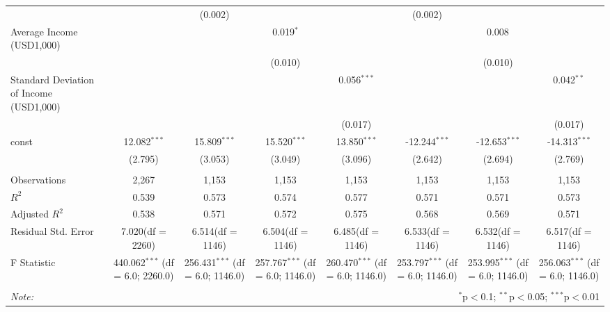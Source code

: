 \begin{table}[!htbp]
\begin{tabular}{@{\extracolsep{5pt}}lccccccc}
  & & (0.002) & & & (0.002) & & \\
 Average Income (USD1,000) & & & 0.019$^{*}$ & & & 0.008$^{}$ & \\
  & & & (0.010) & & & (0.010) & \\
 Standard Deviation of Income (USD1,000) & & & & 0.056$^{***}$ & & & 0.042$^{**}$ \\
  & & & & (0.017) & & & (0.017) \\
 const & 12.082$^{***}$ & 15.809$^{***}$ & 15.520$^{***}$ & 13.850$^{***}$ & -12.244$^{***}$ & -12.653$^{***}$ & -14.313$^{***}$ \\
  & (2.795) & (3.053) & (3.049) & (3.096) & (2.642) & (2.694) & (2.769) \\
\hline \\[-1.8ex]
 Observations & 2,267 & 1,153 & 1,153 & 1,153 & 1,153 & 1,153 & 1,153 \\
 $R^2$ & 0.539 & 0.573 & 0.574 & 0.577 & 0.571 & 0.571 & 0.573 \\
 Adjusted $R^2$ & 0.538 & 0.571 & 0.572 & 0.575 & 0.568 & 0.569 & 0.571 \\
 Residual Std. Error & 7.020(df = 2260) & 6.514(df = 1146) & 6.504(df = 1146) & 6.485(df = 1146) & 6.533(df = 1146) & 6.532(df = 1146) & 6.517(df = 1146)  \\
 F Statistic & 440.062$^{***}$ (df = 6.0; 2260.0) & 256.431$^{***}$ (df = 6.0; 1146.0) & 257.767$^{***}$ (df = 6.0; 1146.0) & 260.470$^{***}$ (df = 6.0; 1146.0) & 253.797$^{***}$ (df = 6.0; 1146.0) & 253.995$^{***}$ (df = 6.0; 1146.0) & 256.063$^{***}$ (df = 6.0; 1146.0) \\
\hline
\hline \\[-1.8ex]
\textit{Note:} & \multicolumn{7}{r}{$^{*}$p$<$0.1; $^{**}$p$<$0.05; $^{***}$p$<$0.01} \\
\end{tabular}
\end{table}